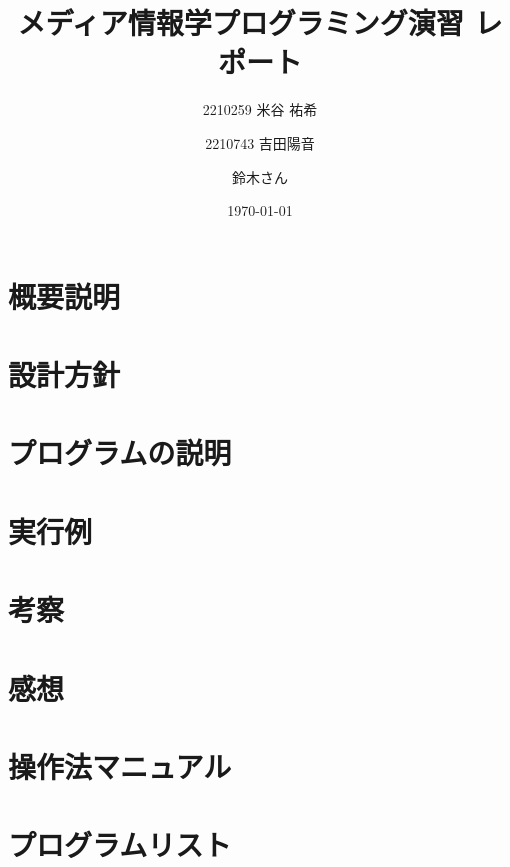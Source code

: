 \documentclass{jsarticle}
\title{メディア情報学プログラミング演習 レポート}
\author{2210259 米谷 祐希 \and 2210743 吉田陽音 \and 鈴木さん}
\date{\today} %
\begin{document}
\maketitle

\section{概要説明}

\section{設計方針}

\section{プログラムの説明}

\section{実行例}

\section{考察}

\section{感想}

\section{操作法マニュアル}

\section{プログラムリスト}
\end{document}
